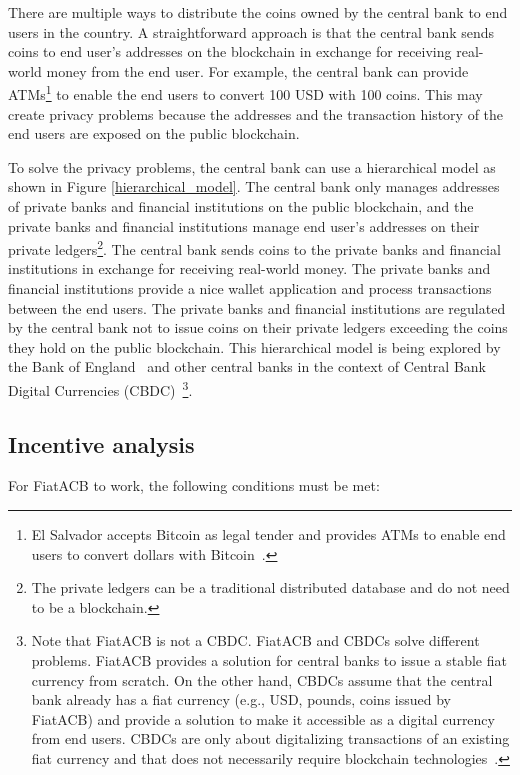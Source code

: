 \documentclass[dvipdfmx,a4paper]{article}
\begin{document}
There are multiple ways to distribute the coins owned by the central bank to end users in the country. A straightforward approach is that the central bank sends coins to end user's addresses on the blockchain in exchange for receiving real-world money from the end user. For example, the central bank can provide ATMs\footnote{El Salvador accepts Bitcoin as legal tender and provides ATMs to enable end users to convert dollars with Bitcoin~\cite{elsalvador}.} to enable the end users to convert 100 USD with 100 coins. This may create privacy problems because the addresses and the transaction history of the end users are exposed on the public blockchain.

To solve the privacy problems, the central bank can use a hierarchical model as shown in Figure \ref{hierarchical_model}. The central bank only manages addresses of private banks and financial institutions on the public blockchain, and the private banks and financial institutions manage end user's addresses on their private ledgers\footnote{The private ledgers can be a traditional distributed database and do not need to be a blockchain.}. The central bank sends coins to the private banks and financial institutions in exchange for receiving real-world money. The private banks and financial institutions provide a nice wallet application and process transactions between the end users. The private banks and financial institutions are regulated by the central bank not to issue coins on their private ledgers exceeding the coins they hold on the public blockchain. This hierarchical model is being explored by the Bank of England~\cite{cbdc1,cbdc2} and other central banks in the context of Central Bank Digital Currencies (CBDC)~\cite{fung2016central}\footnote{Note that FiatACB is not a CBDC. FiatACB and CBDCs solve different problems. FiatACB provides a solution for central banks to issue a stable fiat currency from scratch. On the other hand, CBDCs assume that the central bank already has a fiat currency (e.g., USD, pounds, coins issued by FiatACB) and provide a solution to make it accessible as a digital currency from end users. CBDCs are only about digitalizing transactions of an existing fiat currency and that does not necessarily require blockchain technologies~\cite{ubssurvey}.}.

\subsection{Incentive analysis}

For FiatACB to work, the following conditions must be met:
\end{document}
